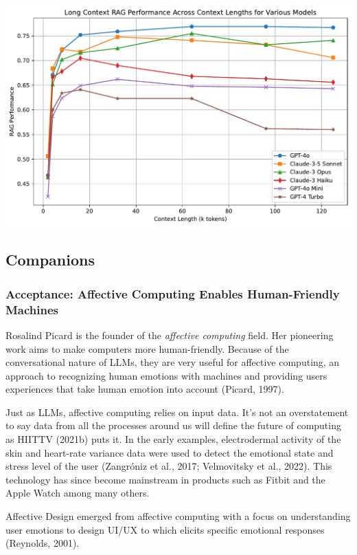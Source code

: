 \documentclass[
  letterpaper,
  DIV=11,
  numbers=noendperiod]{scrartcl}
\begin{document}
\includegraphics{_thesis_files/figure-pdf/cell-28-output-1.pdf}

\subsection{Companions}\label{companions}

\subsubsection{Acceptance: Affective Computing Enables Human-Friendly
Machines}\label{acceptance-affective-computing-enables-human-friendly-machines}

Rosalind Picard is the founder of the \emph{affective computing} field.
Her pioneering work aims to make computers more human-friendly. Because
of the conversational nature of LLMs, they are very useful for affective
computing, an approach to recognizing human emotions with machines and
providing users experiences that take human emotion into account
(Picard, 1997).

Just as LLMs, affective computing relies on input data. It's not an
overstatement to say data from all the processes around us will define
the future of computing as HIITTV (2021b) puts it. In the early
examples, electrodermal activity of the skin and heart-rate variance
data were used to detect the emotional state and stress level of the
user (Zangróniz et al., 2017; Velmovitsky et al., 2022). This technology
has since become mainstream in products such as Fitbit and the Apple
Watch among many others.

Affective Design emerged from affective computing with a focus on
understanding user emotions to design UI/UX to which elicits specific
emotional responses (Reynolds, 2001).
\end{document}
